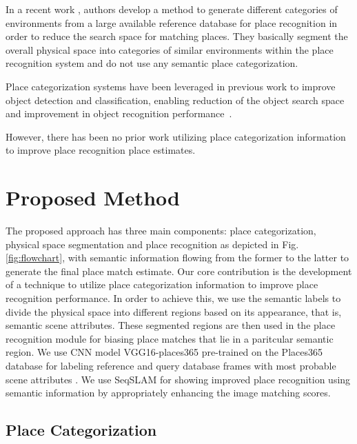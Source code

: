 \documentclass[letterpaper, 10 pt, conference]{ieeeconf}  %
\begin{document}
In a recent work \cite{mohan2015environment}, authors develop a method to generate different categories of environments from a large available reference database for place recognition in order to reduce the search space for matching places. They basically segment the overall physical space into categories of similar environments within the place recognition system and do not use any semantic place categorization.

Place categorization systems have been leveraged in previous work to improve object detection and classification, enabling reduction of the object search space and improvement in object recognition performance~\cite{torralba2003context}. 

However, there has been no prior work utilizing place categorization information to improve place recognition place estimates. 




\section{Proposed Method}
The proposed approach has three main components: place categorization, physical space segmentation and place recognition as depicted in Fig. \ref{fig:flowchart}, with semantic information flowing from the former to the latter to generate the final place match estimate. Our core contribution is the development of a technique to utilize place categorization information to improve place recognition performance. In order to achieve this, we use the semantic labels to divide the physical space into different regions based on its appearance, that is, semantic scene attributes. These segmented regions are then used in the place recognition module for biasing place matches that lie in a paritcular semantic region. We use CNN model VGG16-places365 \cite{cnnPlaces365Github} pre-trained on the Places365 database \cite{zhou2014learning} for labeling reference and query database frames with most probable scene attributes \cite{Patterson2012SunAttributes}. We use SeqSLAM \cite{Milford2012} for showing improved place recognition using semantic information by appropriately enhancing the image matching scores.

\subsection{Place Categorization}
\end{document}
